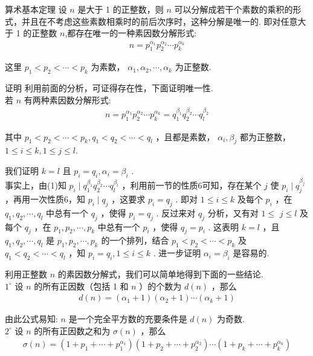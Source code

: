 算术基本定理 设 $n$ 是大于 1 的正整数，则 $n$ 可以分解成若干个素数的乘积的形式，并且在不考虑这些素数相乘时的前后次序时，这种分解是唯一的. 即对任意大于 1 的正整数 $n$,都存在唯一的一种素因数分解形式:\\
\begin{align*}
n=p_{1}^{\alpha_{1}} p_{2}^{\alpha_{2}} \cdots p_{k}^{\alpha_{k}}
\end{align*}

这里 $p_{1}<p_{2}<\cdots<p_{k}$ 为素数， $\alpha_{1}, \alpha_{2}, \cdots, \alpha_{k}$ 为正整数. 

证明 利用前面的分析，可证得存在性，下面证明唯一性. \\
若 $n$ 有两种素因数分解形式:\\
\begin{align*}
n=p_{1}^{\alpha_{1}} p_{2}^{\alpha_{2}} \cdots p_{k}^{\alpha_{k}}=q_{1}^{\beta_{1}} q_{2}^{\beta_{2}} \cdots q_{l}^{\beta_{2}}
\end{align*}

其中 $p_{1}<p_{2}<\cdots<p_{k}, q_{1}<q_{2}<\cdots<q_{l}$ ，且都是素数， $\alpha_{i} ,  \beta_{j}$ 都为正整数， $1 \leqslant i \leqslant k, 1 \leqslant j \leqslant l$.

我们证明 $k=l$ 且 $p_{i}=q_{i}, \alpha_{i}=\beta_{i}$ . \\
事实上，由(1)知 $p_{i} \mid q_{1}^{\beta_{1}} q_{2}^{\beta_{2}} \cdots q_{l}^{\beta_{l}}$ ，利用前一节的性质6可知，存在某个 $j$ 使 $p_{i} \mid q_{j}^{\beta_{j}}$ ，再用一次性质6，知 $p_{i} \mid q_{j}$ ，这要求 $p_{i}=q_{j}$ . 即对 $1 \leqslant i \leqslant k$ 及每个 $p_{i}$ ，在 $q_{1}, q_{2}, \cdots, q_{l}$ 中总有一个 $q_{j}$ ，使得 $p_{i}=q_{j}$ . 反过来对 $q_{j}$ 分析，又有对 $1 \leqslant$ $j \leqslant l$ 及每个 $q_{j}$ ，在 $p_{1}, p_{2}, \cdots, p_{k}$ 中总有一个 $p_{i}$ ，使得 $q_{j}=p_{i}$ . 这表明 $k=l$ ，且 $q_{1}, q_{2}, \cdots, q_{l}$ 是 $p_{1}, p_{2}, \cdots, p_{k}$ 的一个排列，结合 $p_{1}<p_{2}<\cdots<p_{k}$ 及 $q_{1}<q_{2}<\cdots<q_{l}$ ，知 $p_{i}=q_{i}, 1 \leqslant i \leqslant k$ . 进一步证明 $\alpha_{i}=\beta_{i}$ 是容易的. 

利用正整数 $n$ 的素因数分解式，我们可以简单地得到下面的一些结论. \\
$1^{\circ}$ 设 $n$ 的所有正因数（包括 1 和 $n$ ）的个数为 $d(n)$ ，那么\\
\begin{align*}
d(n)=\left(\alpha_{1}+1\right)\left(\alpha_{2}+1\right) \cdots\left(\alpha_{k}+1\right)
\end{align*}

由此公式易知: $n$ 是一个完全平方数的充要条件是 $d(n)$ 为奇数. \\
$2^{\circ}$ 设 $n$ 的所有正因数之和为 $\sigma(n)$ ，那么\\
\begin{align*}
\sigma(n)=\left(1+p_{1}+\cdots+p_{1}^{\alpha_{1}}\right)\left(1+p_{2}+\cdots+p_{2}^{\alpha_{2}}\right) \cdots\left(1+p_{k}+\cdots+p_{k}^{\alpha_{k}}\right)
\end{align*}

